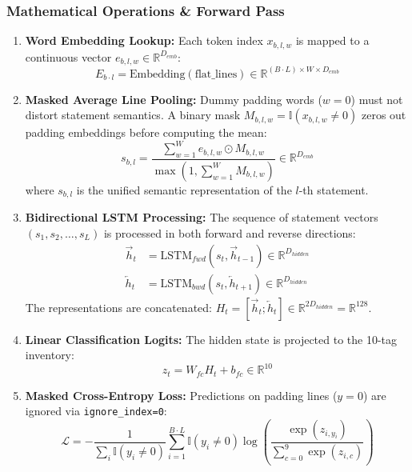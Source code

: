 \documentclass[11pt,a4paper]{article}
\begin{document}
\subsubsection{Mathematical Operations \& Forward Pass}
\begin{enumerate}
    \item \textbf{Word Embedding Lookup:} Each token index $x_{b,l,w}$ is mapped to a continuous vector $e_{b,l,w} \in \mathbb{R}^{D_{emb}}$:
    \[
    E_{b \cdot l} = \text{Embedding}(\text{flat\_lines}) \in \mathbb{R}^{(B \cdot L) \times W \times D_{emb}}
    \]
    \item \textbf{Masked Average Line Pooling:} Dummy padding words ($w=0$) must not distort statement semantics. A binary mask $M_{b,l,w} = \mathbb{I}(x_{b,l,w} \ne 0)$ zeros out padding embeddings before computing the mean:
    \begin{equation}
    s_{b,l} = \frac{\sum_{w=1}^{W} e_{b,l,w} \odot M_{b,l,w}}{\max\left(1, \sum_{w=1}^{W} M_{b,l,w}\right)} \in \mathbb{R}^{D_{emb}}
    \end{equation}
    where $s_{b,l}$ is the unified semantic representation of the $l$-th statement.
    \item \textbf{Bidirectional LSTM Processing:} The sequence of statement vectors $(s_1, s_2, \dots, s_L)$ is processed in both forward and reverse directions:
    \begin{align}
    \vec{h}_t &= \text{LSTM}_{fwd}(s_t, \vec{h}_{t-1}) \in \mathbb{R}^{D_{hidden}} \\
    \overleftarrow{h}_t &= \text{LSTM}_{bwd}(s_t, \overleftarrow{h}_{t+1}) \in \mathbb{R}^{D_{hidden}}
    \end{align}
    The representations are concatenated: $H_t = [\vec{h}_t; \overleftarrow{h}_t] \in \mathbb{R}^{2 D_{hidden}} = \mathbb{R}^{128}$.
    \item \textbf{Linear Classification Logits:} The hidden state is projected to the 10-tag inventory:
    \begin{equation}
    z_t = W_{fc} H_t + b_{fc} \in \mathbb{R}^{10}
    \end{equation}
    \item \textbf{Masked Cross-Entropy Loss:} Predictions on padding lines ($y=0$) are ignored via \texttt{ignore\_index=0}:
    \begin{equation}
    \mathcal{L} = -\frac{1}{\sum_{i} \mathbb{I}(y_i \ne 0)} \sum_{i=1}^{B \cdot L} \mathbb{I}(y_i \ne 0) \log \left( \frac{\exp(z_{i, y_i})}{\sum_{c=0}^{9} \exp(z_{i, c})} \right)
    \end{equation}
\end{enumerate}
\end{document}
